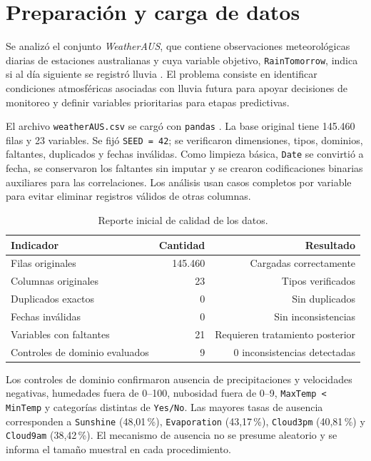 \documentclass[11pt,a4paper]{article}
\begin{document}
\vspace{0.4em}
\tableofcontents
\newpage

\section{Preparación y carga de datos}

Se analizó el conjunto \textit{WeatherAUS}, que contiene observaciones meteorológicas diarias de estaciones australianas y cuya variable objetivo, \texttt{RainTomorrow}, indica si al día siguiente se registró lluvia \cite{kaggle}. El problema consiste en identificar condiciones atmosféricas asociadas con lluvia futura para apoyar decisiones de monitoreo y definir variables prioritarias para etapas predictivas.

El archivo \texttt{weatherAUS.csv} se cargó con \texttt{pandas} \cite{mckinney2010}. La base original tiene 145.460 filas y 23 variables. Se fijó \texttt{SEED = 42}; se verificaron dimensiones, tipos, dominios, faltantes, duplicados y fechas inválidas. Como limpieza básica, \texttt{Date} se convirtió a fecha, se conservaron los faltantes sin imputar y se crearon codificaciones binarias auxiliares para las correlaciones. Los análisis usan casos completos por variable para evitar eliminar registros válidos de otras columnas.

\begin{table}[H]
\centering
\small
\caption{Reporte inicial de calidad de los datos.}
\label{tab:calidad}
\begin{tabular}{lrr}
\toprule
Indicador & Cantidad & Resultado \\
\midrule
Filas originales & 145.460 & Cargadas correctamente \\
Columnas originales & 23 & Tipos verificados \\
Duplicados exactos & 0 & Sin duplicados \\
Fechas inválidas & 0 & Sin inconsistencias \\
Variables con faltantes & 21 & Requieren tratamiento posterior \\
Controles de dominio evaluados & 9 & 0 inconsistencias detectadas \\
\bottomrule
\end{tabular}
\end{table}

Los controles de dominio confirmaron ausencia de precipitaciones y velocidades negativas, humedades fuera de 0--100, nubosidad fuera de 0--9, \texttt{MaxTemp < MinTemp} y categorías distintas de \texttt{Yes/No}. Las mayores tasas de ausencia corresponden a \texttt{Sunshine} (48,01\,\%), \texttt{Evaporation} (43,17\,\%), \texttt{Cloud3pm} (40,81\,\%) y \texttt{Cloud9am} (38,42\,\%). El mecanismo de ausencia no se presume aleatorio y se informa el tamaño muestral en cada procedimiento.
\end{document}
